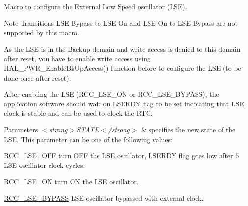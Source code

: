 Macro to configure the External Low Speed oscillator (L\-S\-E). 

\begin{DoxyNote}{Note}
Transitions L\-S\-E Bypass to L\-S\-E On and L\-S\-E On to L\-S\-E Bypass are not supported by this macro. 

As the L\-S\-E is in the Backup domain and write access is denied to this domain after reset, you have to enable write access using H\-A\-L\-\_\-\-P\-W\-R\-\_\-\-Enable\-Bk\-Up\-Access() function before to configure the L\-S\-E (to be done once after reset). 

After enabling the L\-S\-E (R\-C\-C\-\_\-\-L\-S\-E\-\_\-\-O\-N or R\-C\-C\-\_\-\-L\-S\-E\-\_\-\-B\-Y\-P\-A\-S\-S), the application software should wait on L\-S\-E\-R\-D\-Y flag to be set indicating that L\-S\-E clock is stable and can be used to clock the R\-T\-C. 
\end{DoxyNote}

\begin{DoxyParams}{Parameters}
{\em $<$strong$>$\-S\-T\-A\-T\-E$<$/strong$>$} & specifies the new state of the L\-S\-E. This parameter can be one of the following values\-: \begin{DoxyItemize}
\item \hyperlink{group___r_c_c___l_s_e___config_ga6645c27708d0cad1a4ab61d2abb24c77}{R\-C\-C\-\_\-\-L\-S\-E\-\_\-\-O\-F\-F} turn O\-F\-F the L\-S\-E oscillator, L\-S\-E\-R\-D\-Y flag goes low after 6 L\-S\-E oscillator clock cycles. \item \hyperlink{group___r_c_c___l_s_e___config_gac981ea636c2f215e4473901e0912f55a}{R\-C\-C\-\_\-\-L\-S\-E\-\_\-\-O\-N} turn O\-N the L\-S\-E oscillator. \item \hyperlink{group___r_c_c___l_s_e___config_gaad580157edbae878edbcc83c5a68e767}{R\-C\-C\-\_\-\-L\-S\-E\-\_\-\-B\-Y\-P\-A\-S\-S} L\-S\-E oscillator bypassed with external clock. \end{DoxyItemize}
\\
\hline
\end{DoxyParams}
